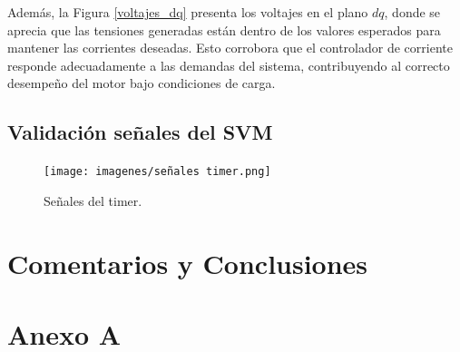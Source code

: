 \documentclass[11pt]{report}
\begin{document}
Además, la Figura \ref{voltajes_dq} presenta los voltajes en el plano $dq$, donde se aprecia que las tensiones generadas están dentro de los valores esperados para mantener las corrientes deseadas. Esto corrobora que el controlador de corriente responde adecuadamente a las demandas del sistema, contribuyendo al correcto desempeño del motor bajo condiciones de carga.

\newpage
\section{Validación señales del SVM}

\begin{figure}[ht]
	\centering
	\texttt{[image: imagenes/señales timer.png]}
	\caption{Señales del timer.}
	\label{señal_timer}
\end{figure}
\FloatBarrier

\newpage
\chapter*{Comentarios y Conclusiones}

\newpage
{}
\printbibliography

\newpage
{}

\chapter*{Anexo A}
\end{document}
